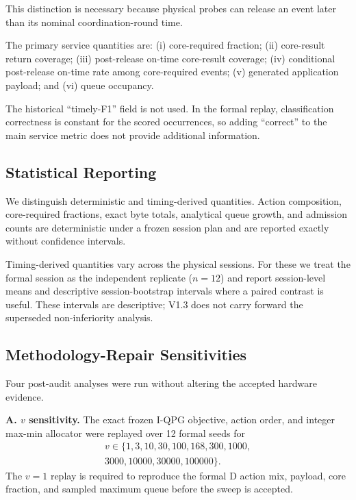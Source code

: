 \documentclass[10pt,journal]{IEEEtran}
\newcommand{\IQPG}{\textsc{I-QPG}}
\begin{document}
This distinction is necessary because physical probes can release an
event later than its nominal coordination-round time.

The primary service quantities are:
(i) core-required fraction;
(ii) core-result return coverage;
(iii) post-release on-time core-result coverage;
(iv) conditional post-release on-time rate among core-required events;
(v) generated application payload; and
(vi) queue occupancy.

The historical ``timely-F1'' field is not used. In the formal replay,
classification correctness is constant for the scored occurrences, so
adding ``correct'' to the main service metric does not provide additional
information.

\subsection{Statistical Reporting}

We distinguish deterministic and timing-derived quantities.
Action composition, core-required fractions, exact byte totals,
analytical queue growth, and admission counts are deterministic under a
frozen session plan and are reported exactly without confidence
intervals.

Timing-derived quantities vary across the physical sessions. For these
we treat the formal session as the independent replicate ($n=12$) and
report session-level means and descriptive session-bootstrap intervals
where a paired contrast is useful. These intervals are descriptive;
V1.3 does not carry forward the superseded non-inferiority analysis.

\subsection{Methodology-Repair Sensitivities}

Four post-audit analyses were run without altering the accepted hardware
evidence.

\textbf{A. $v$ sensitivity.}
The exact frozen \IQPG{} objective, action order, and integer max-min
allocator were replayed over 12 formal seeds for
\begin{multline}
v\in\{1,3,10,30,100,168,300,1000,\\
3000,10000,30000,100000\}.
\end{multline}
The $v=1$ replay is required to reproduce the formal D action mix,
payload, core fraction, and sampled maximum queue before the sweep is
accepted.
\end{document}
